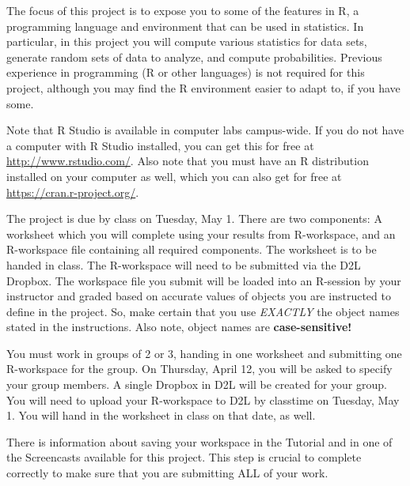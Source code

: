 \documentclass{article}
\begin{document}
\pagestyle{myheadings}

\begin{center}
\textbf{}
\end{center}

The focus of this project is to expose you to some of the features in R, a programming language and environment that can be used in statistics. In particular, in this project you will compute various statistics for data sets, generate random sets of data to analyze, and compute probabilities. Previous experience in programming (R or other languages) is not required for this project, although you may find the R environment easier to adapt to, if you have some.

Note that R Studio is available in computer labs campus-wide. If you do not have a computer with R Studio installed, you can get this for free at \url{http://www.rstudio.com/}. Also note that you must have an R distribution installed on your computer as well, which you can also get for free at \url{https://cran.r-project.org/}.

The project is due by class on Tuesday, May 1. There are two components: A worksheet which you will complete using your results from R-workspace, and an R-workspace file containing all required components. The worksheet is to be handed in class. The R-workspace will need to be submitted via the D2L Dropbox. The workspace file you submit will be loaded into an R-session by your instructor and graded based on accurate values of objects you are instructed to define in the project. So, make certain that you use {\em EXACTLY} the object names stated in the instructions. Also note, object names are \textbf{case-sensitive!}

You must work in groups of 2 or 3, handing in one worksheet and submitting one R-workspace for the group.  On Thursday, April 12, you will be asked to specify your group members. A single Dropbox in D2L will be created for your group. You will need to upload your R-workspace to D2L by classtime on Tuesday, May 1. You will hand in the worksheet in class on that date, as well.

There is information about saving your workspace in the Tutorial and in one of the Screencasts available for this project. This step is crucial to complete correctly to make sure that you are submitting ALL of your work.
\end{document}
